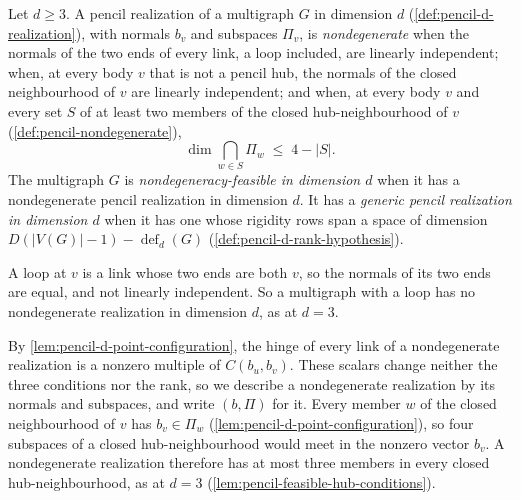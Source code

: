 \begin{definition}
  \label{def:pencil-d-nondegenerate}
  \leanok
  Let $d \ge 3$. A pencil realization of a multigraph $G$ in dimension
  $d$ (\cref{def:pencil-d-realization}), with normals $b_v$ and
  subspaces $\Pi_v$, is \emph{nondegenerate} when the normals of the two
  ends of every link, a loop included, are linearly independent; when,
  at every body $v$ that is not a pencil hub, the normals of the closed
  neighbourhood of $v$ are linearly independent; and when, at every body
  $v$ and every set $S$ of at least two members of the closed
  hub-neighbourhood of $v$ (\cref{def:pencil-nondegenerate}),
  \[
    \dim \bigcap_{w \in S} \Pi_w \;\le\; 4 - |S|.
  \]
  The multigraph $G$ is \emph{nondegeneracy-feasible in dimension $d$}
  when it has a nondegenerate pencil realization in dimension $d$. It has
  a \emph{generic pencil realization in dimension $d$} when it has one
  whose rigidity rows span a space of dimension
  $D(|V(G)| - 1) - \operatorname{def}_d(G)$
  (\cref{def:pencil-d-rank-hypothesis}).
\end{definition}

A loop at $v$ is a link whose two ends are both $v$, so the normals of
its two ends are equal, and not linearly independent. So a multigraph
with a loop has no nondegenerate realization in dimension $d$, as at
$d = 3$.

By \cref{lem:pencil-d-point-configuration}, the hinge of every link of a
nondegenerate realization is a nonzero multiple of $C(b_u, b_v)$. These
scalars change neither the three conditions nor the rank, so we describe
a nondegenerate realization by its normals and subspaces, and write
$(b, \Pi)$ for it. Every member $w$ of the closed neighbourhood of $v$
has $b_v \in \Pi_w$ (\cref{lem:pencil-d-point-configuration}), so four
subspaces of a closed hub-neighbourhood would meet in the nonzero vector
$b_v$. A nondegenerate realization therefore has at most three members
in every closed hub-neighbourhood, as at $d = 3$
(\cref{lem:pencil-feasible-hub-conditions}).

